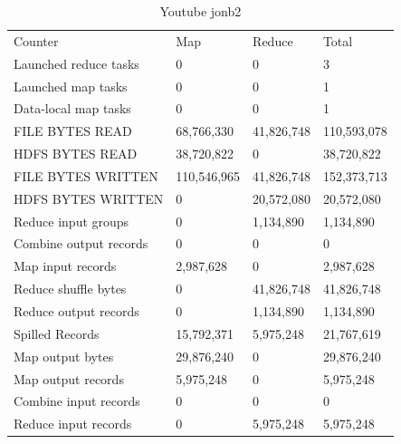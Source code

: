 \documentclass[paper=a4, fontsize=11pt]{scrartcl}	%
\numberwithin{equation}{section}															%
\numberwithin{figure}{section}																%
\numberwithin{table}{section}																%
\begin{document}
\begin{table}[]
	\centering
	\caption{Youtube jonb2}
	\label{my-label}
	\begin{tabular}{llll}
Counter	&Map	&Reduce	&Total\\
Launched reduce tasks	&0	&0	&3\\
Launched map tasks	&0	&0	&1\\
Data-local map tasks	&0	&0	&1\\
FILE BYTES READ	&68,766,330	&41,826,748	&110,593,078\\
HDFS BYTES READ	&38,720,822	&0	&38,720,822\\
FILE BYTES WRITTEN &110,546,965	&41,826,748	&152,373,713\\
HDFS BYTES WRITTEN	&0	&20,572,080	&20,572,080\\
Reduce input groups	&0	&1,134,890	&1,134,890\\
Combine output records	&0	&0	&0\\
Map input records	&2,987,628	&0	&2,987,628\\
Reduce shuffle bytes	&0	&41,826,748	&41,826,748\\
Reduce output records	&0	&1,134,890	&1,134,890\\
Spilled Records	&15,792,371	&5,975,248	&21,767,619\\
Map output bytes	&29,876,240	&0	&29,876,240\\
Map output records	&5,975,248	&0	&5,975,248\\
Combine input records	&0	&0	&0\\
Reduce input records	&0	&5,975,248	&5,975,248\\
	\end{tabular}
\end{table}
\end{document}
